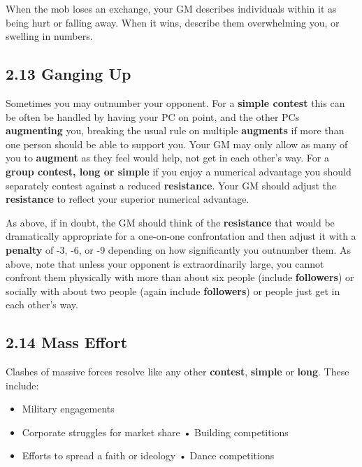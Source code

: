 \documentclass[
]{article}
\providecommand{\tightlist}{%
  \setlength{\itemsep}{0pt}\setlength{\parskip}{0pt}}
\begin{document}
When the mob loses an exchange, your GM describes individuals within it
as being hurt or falling away. When it wins, describe them overwhelming
you, or swelling in numbers.

\hypertarget{ganging-up}{%
\subsection{2.13 Ganging Up}\label{ganging-up}}

Sometimes you may outnumber your opponent. For a \textbf{simple contest}
this can be often be handled by having your PC on point, and the other
PCs \textbf{augmenting} you, breaking the usual rule on multiple
\textbf{augments} if more than one person should be able to support you.
Your GM may only allow as many of you to \textbf{augment} as they feel
would help, not get in each other's way. For a \textbf{group contest,
long or simple} if you enjoy a numerical advantage you should separately
contest against a reduced \textbf{resistance}. Your GM should adjust the
\textbf{resistance} to reflect your superior numerical advantage.

As above, if in doubt, the GM should think of the \textbf{resistance}
that would be dramatically appropriate for a one-on-one confrontation
and then adjust it with a \textbf{penalty} of -3, -6, or -9 depending on
how significantly you outnumber them. As above, note that unless your
opponent is extraordinarily large, you cannot confront them physically
with more than about six people (include \textbf{followers}) or socially
with about two people (again include \textbf{followers}) or people just
get in each other's way.

\hypertarget{mass-effort}{%
\subsection{2.14 Mass Effort}\label{mass-effort}}

Clashes of massive forces resolve like any other \textbf{contest},
\textbf{simple} or \textbf{long}. These include:

\begin{itemize}
\tightlist
\item
  Military engagements
\item
  Corporate struggles for market share • Building competitions
\item
  Efforts to spread a faith or ideology • Dance competitions
\end{itemize}
\end{document}
